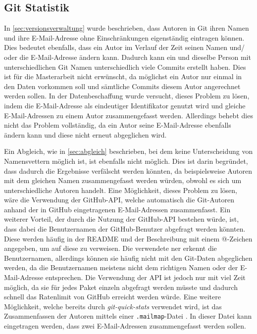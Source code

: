 \subsection*{Git Statistik}
\label{subsec:git_statistik}
In \autoref{sec:versionsverwaltung} wurde beschrieben, dass Autoren in Git ihren Namen und ihre E-Mail-Adresse ohne Einschränkungen eigenständig eintragen können.
Dies bedeutet ebenfalls, dass ein Autor im Verlauf der Zeit seinen Namen und/ oder die E-Mail-Adresse ändern kann.
Dadurch kann ein und dieselbe Person mit unterschiedlichen Git Namen unterschiedlich viele Commits erstellt haben.
Dies ist für die Masterarbeit nicht erwünscht, da möglichst ein Autor nur einmal in den Daten vorkommen soll und sämtliche Commits diesem Autor angerechnet werden sollen.
In der Datenbeschaffung wurde versucht, dieses Problem zu lösen, indem die E-Mail-Adresse als eindeutiger Identifikator genutzt wird und gleiche E-Mail-Adressen zu einem Autor zusammengefasst werden.
Allerdings behebt dies nicht das Problem vollständig, da ein Autor seine E-Mail-Adresse ebenfalls ändern kann und diese nicht erneut abgeglichen wird.

Ein Abgleich, wie in \autoref{sec:abgleich} beschrieben, bei dem keine Unterscheidung von Namensvettern möglich ist, ist ebenfalls nicht möglich. 
Dies ist darin begründet, dass dadurch die Ergebnisse verfälscht werden könnten, da beispielsweise Autoren mit dem gleichen Namen zusammengefasst werden würden, obwohl es sich um unterschiedliche Autoren handelt.
Eine Möglichkeit, dieses Problem zu lösen, wäre die Verwendung der GitHub-API, welche automatisch die Git-Autoren anhand der in GitHub eingetragenen E-Mail-Adressen zusammenfasst.
Ein weiterer Vorteil, der durch die Nutzung der GitHub-API bestehen würde, ist, dass dabei die Benutzernamen der GitHub-Benutzer abgefragt werden könnten.
Diese werden häufig in der README und der Beschreibung mit einem @-Zeichen angegeben, um auf diese zu verweisen.
Die verwendete \gls{ner} erkennt die Benutzernamen, allerdings können sie häufig nicht mit den Git-Daten abgeglichen werden, da die Benutzernamen meistens nicht dem richtigen Namen oder der E-Mail-Adresse entsprechen.
Die Verwendung der API ist jedoch nur mit viel Zeit möglich, da sie für jedes Paket einzeln abgefragt werden müsste und dadurch schnell das Ratenlimit von GitHub erreicht werden würde.
Eine weitere Möglichkeit, welche bereits durch \emph{git-quick-stats} verwendet wird, ist das Zusammenfassen der Autoren mittels einer \texttt{.mailmap}-Datei \autocite{chacon_git_2024-1}.
In dieser Datei kann eingetragen werden, dass zwei E-Mail-Adressen zusammengefasst werden sollen.

